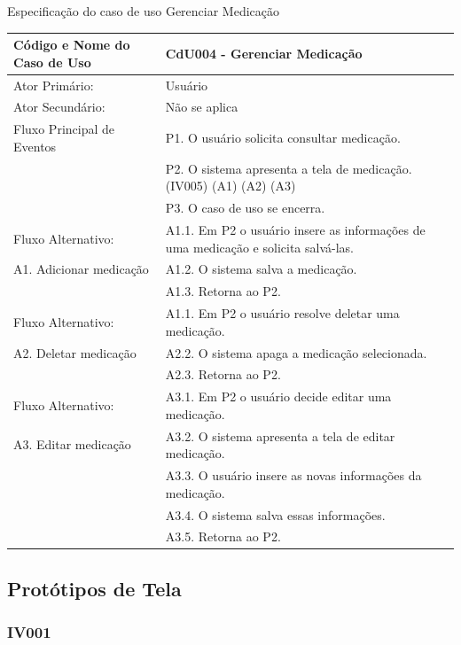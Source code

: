 \documentclass[12pt]{article}
\begin{document}
	\begin{center}
		\caption{Especificação do caso de uso Gerenciar Medicação}
		\begin{tabular}{ | l |  p{10cm} |}
			\hline
			Código e Nome do Caso de Uso & CdU004 - Gerenciar Medicação \\ \hline
			Ator Primário: & Usuário \\ 
			Ator Secundário: & Não se aplica \\ \hline
			Fluxo Principal de Eventos & P1. O usuário solicita consultar medicação. \\
						   & P2. O sistema apresenta a tela de medicação. (IV005) (A1) (A2) (A3) \\
						   & P3. O caso de uso se encerra. \\ \hline
			Fluxo Alternativo:         & A1.1. Em P2 o usuário insere as informações de uma medicação e solicita salvá-las. \\
			A1. Adicionar medicação    & A1.2. O sistema salva a medicação. \\ 
						   & A1.3. Retorna ao P2. \\ \hline
			Fluxo Alternativo:         & A1.1. Em P2 o usuário resolve deletar uma medicação. \\
			A2. Deletar medicação      & A2.2. O sistema apaga a medicação selecionada. \\
						   & A2.3. Retorna ao P2. \\ \hline
			Fluxo Alternativo:         & A3.1. Em P2 o usuário decide editar uma medicação. \\
			A3. Editar medicação       & A3.2. O sistema apresenta a tela de editar medicação. \\
						   & A3.3. O usuário insere as novas informações da medicação. \\
						   & A3.4. O sistema salva essas informações. \\
						   & A3.5. Retorna ao P2. \\
			\hline
		\end{tabular}
	\end{center}

	\newpage

	\subsection{Protótipos de Tela}

	\subsubsection{IV001}
\end{document}
